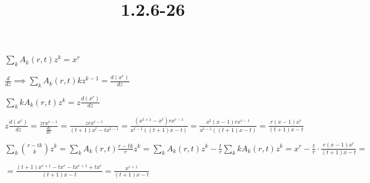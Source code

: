 \documentclass{article}
\title{1.2.6-26}
\begin{document}
\maketitle

$\sum_k A_k(r,t)z^k = x^r$

$\frac{d}{dz} \implies \sum_k A_k(r,t)kz^{k-1} = \frac{d(x^r)}{dz}$

$\sum_{k}kA_k(r,t)z^k = z\frac{d(x^r)}{dz}$

$z\frac{d(x^r)}{dz} = \frac{zrx^{r-1}}{\frac{dz}{dx}} = \frac{zrx^{r-1}}{(t+1)x^t - tx^{t-1}} = \frac{(x^{t+1}-x^t)rx^{r-1}}{x^{t-1}((t+1)x - t)} = \frac{x^t(x-1)rx^{r-1}}{x^{t-1} ((t+1)x - t)} = \frac{r(x-1)x^r}{(t+1)x - t}$

$\sum_k \binom{r-tk}{k}z^k = \sum_k A_k(r, t) \frac{r-tk}{r}z^k = \sum_k A_k(r,t)z^k - \frac{t}{r} \sum_k kA_k(r,t)z^k = x^r - \frac{t}{r} \cdot \frac{r(x-1)x^r}{(t+1)x - t} =$

$= \frac{(t+1)x^{r+1} - tx^r - tx^{r+1} + tx^r }{(t+1)x-t} = \frac{x^{r+1}}{(t+1)x-t}$
\end{document}
